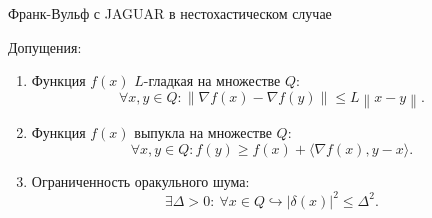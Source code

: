 \documentclass{beamer}
\newcommand{\expect}[1]{\mathbb{E}\left[ #1 \right]}
\newcommand{\norms}[1]{\left\| #1 \right\|}
\begin{document}
\begin{frame}{Франк-Вульф с JAGUAR в нестохастическом случае}

    Допущения:
        \begin{enumerate}
            \item Функция $f(x)$ $L$-гладкая на множестве $Q$: 
                \begin{equation*}
                    \forall x, y \in Q: \left\|\nabla f(x) - \nabla f(y)\right\| \leq L \left\|x-y\right\|.
                \end{equation*}

            \item Функция $f(x)$ выпукла на множестве $Q$:
                \begin{equation*}
                    \forall x, y \in Q: f(y) \geq f(x) + \langle \nabla f(x), y - x \rangle.
                \end{equation*}

            \item Ограниченность оракульного шума:
                \begin{equation*}
                    \exists \Delta > 0 : ~\forall x \in Q \hookrightarrow |\delta(x)|^2 \leq \Delta^2.
                \end{equation*}
                
        \end{enumerate}

\end{frame}



            
            

\end{document}
